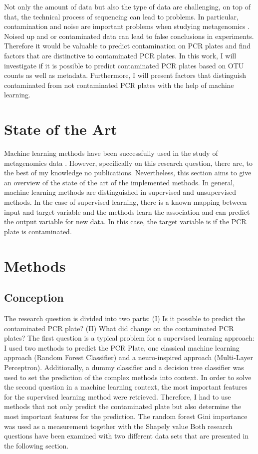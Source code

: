 \documentclass{svproc}
\begin{document}
Not only the amount of data but also the type of data are challenging, on top of that, the technical process of sequencing can lead to problems.
In particular, contamination and noise are important problems when studying metagenomics \cite{paper Michel}. Noised up and or contaminated data can lead to false conclusions in experiments. Therefore it would be valuable to predict contamination on PCR plates and find factors that are distinctive to contaminated PCR plates. In this work, I will investigate if it is possible to predict contaminated PCR plates based on OTU counts as well as metadata. Furthermore, I will present factors that distinguish contaminated from not contaminated PCR plates with the help of machine learning.


\section{State of the Art}
Machine learning methods have been successfully used in the study of metagenomics data  \cite{Soueidan2017}. However, specifically on this research question, there are, to the best of my knowledge no publications. Nevertheless, this section aims to give an overview of the state of the art of the implemented methods. In general, machine learning methods are distinguished in supervised and unsupervised methods. In the case of supervised learning, there is a known mapping between input and target variable and the methods learn the association and can predict the output variable for new data. In this case, the target variable is if the PCR plate is contaminated.

%
%
\section{Methods}
%
\subsection{Conception}

The research question is divided into two parts: (I) Is it possible to predict the contaminated PCR plate? (II) What did change on the contaminated PCR plates? 
The first question is a typical problem for a supervised learning approach: I used two methods to predict the PCR Plate, one classical machine learning approach (Random Forest Classifier) and a neuro-inspired approach (Multi-Layer Perceptron).  Additionally, a dummy classifier and a decision tree classifier was used to set the prediction of the complex methods into context.
In order to solve the second question in a machine learning context, the most important features for the supervised learning method were retrieved. Therefore, I had to use methods that not only predict the contaminated plate but also determine the most important features for the prediction. The random forest Gini importance was used as a measurement together with the Shapely value
Both research questions have been examined with two different data sets that are presented in the following section.
\end{document}
